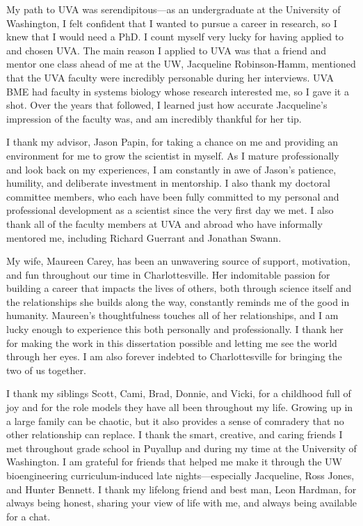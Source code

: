 \documentclass[11pt,onecolumn,notitlepage,openany,twoside]{book}
\begin{document}
My path to UVA was serendipitous---as an undergraduate at the University of Washington, I felt confident that I wanted to pursue a career in research, so I knew that I would need a PhD. I count myself very lucky for having applied to and chosen UVA. The main reason I applied to UVA was that a friend and mentor one class ahead of me at the UW, Jacqueline Robinson-Hamm, mentioned that the UVA faculty were incredibly personable during her interviews. UVA BME had faculty in systems biology whose research interested me, so I gave it a shot. Over the years that followed, I learned just how accurate Jacqueline's impression of the faculty was, and am incredibly thankful for her tip.

I thank my advisor, Jason Papin, for taking a chance on me and providing an environment for me to grow the scientist in myself. As I mature professionally and look back on my experiences, I am constantly in awe of Jason's patience, humility, and deliberate investment in mentorship. I also thank my doctoral committee members, who each have been fully committed to my personal and professional development as a scientist since the very first day we met. I also thank all of the faculty members at UVA and abroad who have informally mentored me, including Richard Guerrant and Jonathan Swann.

My wife, Maureen Carey, has been an unwavering source of support, motivation, and fun throughout our time in Charlottesville. Her indomitable passion for building a career that impacts the lives of others, both through science itself and the relationships she builds along the way, constantly reminds me of the good in humanity. Maureen's thoughtfulness touches all of her relationships, and I am lucky enough to experience this both personally and professionally. I thank her for making the work in this dissertation possible and letting me see the world through her eyes. I am also forever indebted to Charlottesville for bringing the two of us together.

I thank my siblings Scott, Cami, Brad, Donnie, and Vicki, for a childhood full of joy and for the role models they have all been throughout my life. Growing up in a large family can be chaotic, but it also provides a sense of comradery that no other relationship can replace. I thank the smart, creative, and caring friends I met throughout grade school in Puyallup and during my time at the University of Washington. I am grateful for friends that helped me make it through the UW bioengineering curriculum-induced late nights---especially Jacqueline, Ross Jones, and Hunter Bennett. I thank my lifelong friend and best man, Leon Hardman, for always being honest, sharing your view of life with me, and always being available for a chat.
\end{document}
